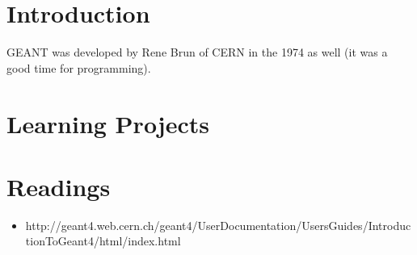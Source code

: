 \section{Introduction}
GEANT was developed by Rene Brun of CERN in the 1974 as well (it was a good time for programming).


\section{Learning Projects}


\section{Readings}
\begin{itemize}
  \item http://geant4.web.cern.ch/geant4/UserDocumentation/UsersGuides/IntroductionToGeant4/html/index.html
\end{itemize}

